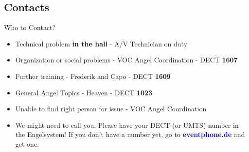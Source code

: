 \documentclass[hyperref={pdfpagelabels=false},aspectratio=169]{beamer}
\begin{document}
\subsection{Contacts}			%
\begin{frame}{Who to Contact?}
\begin{itemize}
\item Technical problem \textbf{in the hall} - A/V Technician on duty
\item Organization or social problems - VOC Angel Coordination - DECT \textbf{1607}
\item Further training - Frederik and Capo - DECT \textbf{1609}
\item General Angel Topics - Heaven - DECT \textbf{1023}
\item Unable to find right person for issue - VOC Angel Coordination
\item We might need to call you. Please have your DECT (or UMTS) number in the Engelsystem! If you don't have a number yet, go to 
\textcolor{blue}{\textbf{eventphone.de}} and get one. 
\end{itemize} 
\end{frame}


\end{document}
